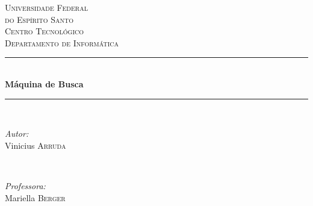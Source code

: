\documentclass[a4paper,12pt]{article}
\begin{document}
 



\begin{titlepage}

\newcommand{\HRule}{\rule{\linewidth}{0.5mm}} %

\center %
 

\textsc{\LARGE Universidade Federal\\do Espírito Santo}\\[1.5cm] %
\textsc{\Large Centro Tecnológico}\\[0.5cm] %
\textsc{\large Departamento de Informática}\\[0.5cm] %


\HRule \\[0.4cm]
{ \huge \bfseries Máquina de Busca}\\[0.4cm] %
\HRule \\[1.5cm]


\begin{minipage}{0.4\textwidth}
\begin{flushleft} \large
\emph{Autor:}\\
Vinicius \textsc{Arruda} %
\end{flushleft}
\end{minipage}
~
\begin{minipage}{0.4\textwidth}
\begin{flushright} \large
\emph{Professora:} \\
Mariella \textsc{Berger} %
\end{flushright}
\end{minipage}\\[2cm]


\end{titlepage}
\end{document}
